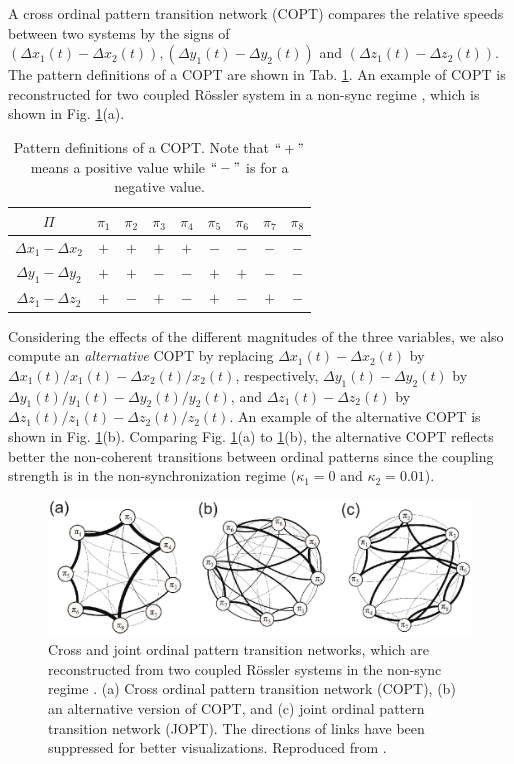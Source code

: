 		A cross ordinal pattern transition network (COPT) compares the relative speeds between two systems by the signs of $(\Delta x_1(t) - \Delta x_2(t)), (\Delta y_1(t) - \Delta y_2(t))$ and $(\Delta z_1(t) - \Delta z_2(t))$. The pattern definitions of a COPT are shown in Tab. \ref{tab:3DCOPT}. An example of COPT is reconstructed for two coupled R\"ossler system in a non-sync regime \cite{Guo2018}, which is shown in Fig. \ref{fig:rosCOPT}(a). 
\begin{table}[htb]
\centering
\begin{tabular}{|c|c|c|c|c|c|c|c|c|}
\hline
$\Pi$      & $\pi_1$ & $\pi_2$ & $\pi_3$ & $\pi_4$ & $\pi_5$ & $\pi_6$ & $\pi_7$
& $\pi_8$\\
\hline
$\Delta x_1 - \Delta x_2$ & $+ $ & $+ $ & $+$ & $+$ & $ - $ & $ - $ & $-$ & $ - $\\
\hline
$\Delta y_1 - \Delta y_2$ & $ + $ & $ + $ & $ -$ & $ -$ & $ + $ & $ + $ & $ -$ & $ -$\\
\hline
$\Delta z_1 - \Delta z_2$ & $ + $ & $ - $ & $ +$ & $ -$ & $ + $ & $ - $ & $+$ & $ -$\\
\hline
\end{tabular}
\caption{Pattern definitions of a COPT. Note that $``+"$ means a positive value while $``-"$ is for a negative value.  \label{tab:3DCOPT}}
\end{table}
Considering the effects of the different magnitudes of the three variables, we also compute an {\emph{alternative}} COPT by replacing $\Delta x_1(t) - \Delta x_2(t)$ by $\Delta x_1(t) / x_1(t) - \Delta x_2(t) / x_2(t)$, respectively, $\Delta y_1(t) - \Delta y_2(t)$ by $\Delta y_1(t) / y_1(t) - \Delta y_2(t) / y_2(t)$, and $\Delta z_1(t) - \Delta z_2(t)$ by $\Delta z_1(t) / z_1(t) - \Delta z_2(t) / z_2(t)$. An example of the alternative COPT is shown in Fig. \ref{fig:rosCOPT}(b). Comparing Fig. \ref{fig:rosCOPT}(a) to \ref{fig:rosCOPT}(b), the alternative COPT reflects better the non-coherent transitions between ordinal patterns since the coupling strength is in the non-synchronization regime ($\kappa_{1} = 0$ and $\kappa_{2} = 0.01$). 

\begin{figure}
	\centering
	\includegraphics[width=\columnwidth]{Chapter05_TransitionNt/copt_jopt.eps}
	\caption{\small{Cross and joint ordinal pattern transition networks, which are reconstructed from two coupled R\"ossler systems in the non-sync regime \cite{Guo2018}. (a) Cross ordinal pattern transition network (COPT), (b) an alternative version of COPT, and (c) joint ordinal pattern transition network (JOPT). The directions of links have been suppressed for better visualizations. Reproduced from \cite{Guo2018}. } \label{fig:rosCOPT}}
\end{figure}	


